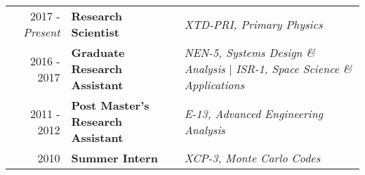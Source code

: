 %
%

\normalsize



\begin{minipage}{\textwidth}
     \begin{tabular}{r|ll}
	     2017 - \emph{Present} & \textbf{Research Scientist}  & \textit{XTD-PRI, Primary Physics}  \\
	     2016 - 2017 & \textbf{Graduate Research Assistant}  & \textit{NEN-5, Systems Design \& Analysis} | 
									     \textit{ISR-1, Space Science \& Applications} \\
	     2011 - 2012 & \textbf{Post Master's Research Assistant}  & \textit{E-13, Advanced Engineering Analysis} \\
	     2010 & \textbf{Summer Intern} & \textit{XCP-3, Monte Carlo Codes} \\
     \end{tabular}
\end{minipage}

